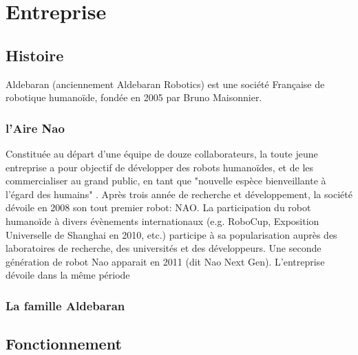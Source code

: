\chapter*{Entreprise}
\label{Entreprise}
\thispagestyle{fancy}

\section{Histoire}
\label{Entreprise: histoire}
Aldebaran (anciennement Aldebaran Robotics) est une société Française de robotique humanoïde, fondée en 2005 par Bruno Maisonnier. 

\subsection{l'Aire Nao}
\label{Entreprise:Histoire:Nao}
Constituée au départ d'une équipe de douze collaborateurs, la toute jeune entreprise a pour objectif de développer des robots humanoïdes, et de les commercialiser au grand public, en tant que "nouvelle espèce bienveillante à l'égard des humains" . Après trois année de recherche et développement, la société dévoile en 2008 son tout premier robot: NAO. La participation du robot humanoïde à divers évènements internationaux (e.g. RoboCup, Exposition Universelle de Shanghai en 2010, etc.) participe à sa popularisation auprès des laboratoires de recherche, des universités et des développeurs. Une seconde génération de robot Nao apparait en 2011 (dit Nao Next Gen). L'entreprise dévoile dans la même période 

\subsection{La famille Aldebaran}

\section{Fonctionnement}
